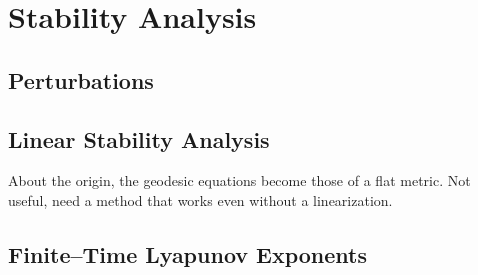 \section{Stability Analysis}

\subsection{Perturbations}

\subsection{Linear Stability Analysis}

About the origin, the geodesic equations become those of a flat metric.
Not useful, need a method that works even without a linearization.

\subsection{Finite--Time Lyapunov Exponents}

